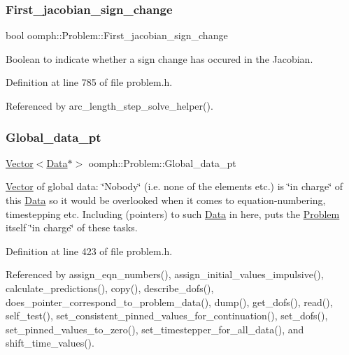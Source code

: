 \subsubsection{\texorpdfstring{First\+\_\+jacobian\+\_\+sign\+\_\+change}{First\_jacobian\_sign\_change}}
{\footnotesize\ttfamily bool oomph\+::\+Problem\+::\+First\+\_\+jacobian\+\_\+sign\+\_\+change\hspace{0.3cm}{\ttfamily [protected]}}



Boolean to indicate whether a sign change has occured in the Jacobian. 



Definition at line 785 of file problem.\+h.



Referenced by arc\+\_\+length\+\_\+step\+\_\+solve\+\_\+helper().

\mbox{\label{classoomph_1_1Problem_aa963c98e91d135d31cdcfbe1afa64603}} 
\subsubsection{\texorpdfstring{Global\+\_\+data\+\_\+pt}{Global\_data\_pt}}
{\footnotesize\ttfamily \hyperlink{classoomph_1_1Vector}{Vector}$<$\hyperlink{classoomph_1_1Data}{Data}$\ast$$>$ oomph\+::\+Problem\+::\+Global\+\_\+data\+\_\+pt\hspace{0.3cm}{\ttfamily [private]}}



\hyperlink{classoomph_1_1Vector}{Vector} of global data\+: \char`\"{}\+Nobody\char`\"{} (i.\+e. none of the elements etc.) is \char`\"{}in charge\char`\"{} of this \hyperlink{classoomph_1_1Data}{Data} so it would be overlooked when it comes to equation-\/numbering, timestepping etc. Including (pointers) to such \hyperlink{classoomph_1_1Data}{Data} in here, puts the \hyperlink{classoomph_1_1Problem}{Problem} itself \char`\"{}in charge\char`\"{} of these tasks. 



Definition at line 423 of file problem.\+h.



Referenced by assign\+\_\+eqn\+\_\+numbers(), assign\+\_\+initial\+\_\+values\+\_\+impulsive(), calculate\+\_\+predictions(), copy(), describe\+\_\+dofs(), does\+\_\+pointer\+\_\+correspond\+\_\+to\+\_\+problem\+\_\+data(), dump(), get\+\_\+dofs(), read(), self\+\_\+test(), set\+\_\+consistent\+\_\+pinned\+\_\+values\+\_\+for\+\_\+continuation(), set\+\_\+dofs(), set\+\_\+pinned\+\_\+values\+\_\+to\+\_\+zero(), set\+\_\+timestepper\+\_\+for\+\_\+all\+\_\+data(), and shift\+\_\+time\+\_\+values().

